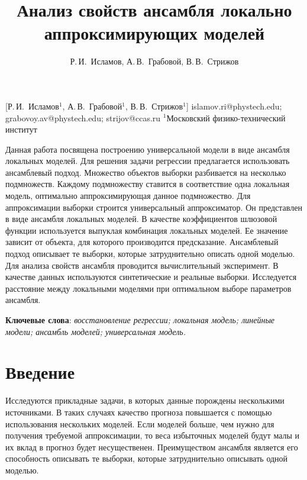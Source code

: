 \documentclass[12pt, twoside]{article}
\begin{document}
\title
    [Анализ свойств ансамбля локально аппроксимирующих моделей] %
    {Анализ свойств ансамбля локально аппроксимирующих моделей}
\author
    [Р.\,И.~Исламов, А.\,В.~Грабовой, В.\,В.~Стрижов] %
    {Р.\,И.~Исламов, А.\,В.~Грабовой, В.\,В.~Стрижов} %
    [Р.\,И.~Исламов$^1$, А.\,В.~Грабовой$^1$, В.\,В.~Стрижов$^{1}$] %
\email
    {islamov.ri@phystech.edu; grabovoy.av@phystech.edu;  strijov@ccas.ru}
\organization
    {$^1$Московский физико-технический институт}
\abstract
    {Данная работа посвящена построению универсальной модели в виде ансамбля локальных моделей. Для решения задачи регрессии  предлагается использовать ансамблевый подход. Множество объектов выборки разбивается на несколько подмножеств. Каждому подмножеству ставится в соответствие одна локальная модель, оптимально аппроксимирующая данное подмножество. Для аппроксимации выборки строится универсальный аппроксиматор. Он представлен в виде ансамбля локальных моделей. В качестве коэффициентов шлюзовой функции используется выпуклая комбинация локальных моделей. Ее значение зависит от объекта, для которого производится предсказание. Ансамблевый подход описывает те выборки, которые затруднительно описать одной моделью. Для анализа свойств ансамбля проводится вычислительный эксперимент. В качестве данных используются синтетические и реальные выборки. Исследуется расстояние между локальными моделями при оптимальном выборе параметров ансамбля. 
	
\bigskip
\noindent
\textbf{Ключевые слова}: \emph {восстановление регрессии; локальная модель; линейные модели; ансамбль моделей; универсальная модель.}
}

\maketitle
\linenumbers

\section{Введение}

Исследуются прикладные задачи, в которых данные порождены несколькими источниками. В таких случаях качество прогноза повышается с помощью использования нескольких моделей. Если моделей больше, чем нужно для получения требуемой аппроксимации, то веса избыточных моделей будут малы и их вклад в прогноз будет несущественен. Преимуществом ансамбля является его способность описывать те выборки, которые затруднительно описывать одной моделью.
\end{document}
